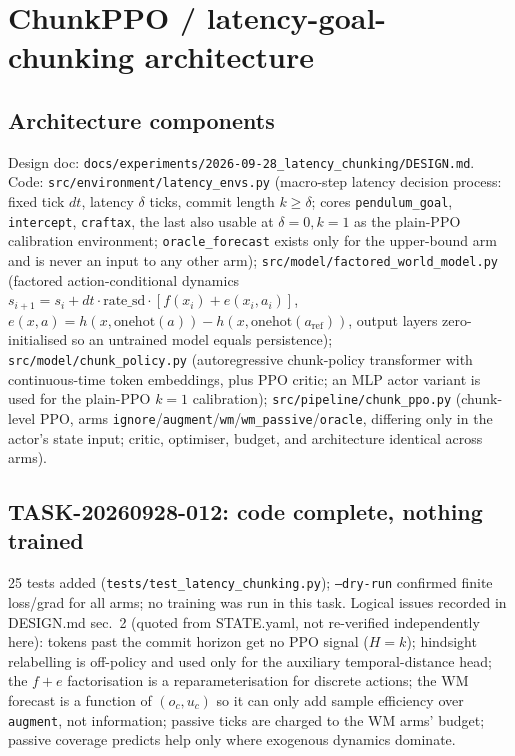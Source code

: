 \documentclass[11pt]{article}
\newcommand{\srcpath}[1]{\texttt{\small #1}}
\begin{document}
\clearpage
\section{ChunkPPO / latency-goal-chunking architecture}
\label{sec:latency}

\subsection{Architecture components}

Design doc: \srcpath{docs/experiments/2026-09-28\_latency\_chunking/DESIGN.md}. Code:
\srcpath{src/environment/latency\_envs.py} (macro-step latency decision process: fixed tick $dt$,
latency $\delta$ ticks, commit length $k \ge \delta$; cores \texttt{pendulum\_goal},
\texttt{intercept}, \texttt{craftax}, the last also usable at $\delta=0,k=1$ as the plain-PPO
calibration environment; \texttt{oracle\_forecast} exists only for the upper-bound arm and is never
an input to any other arm); \srcpath{src/model/factored\_world\_model.py} (factored
action-conditional dynamics $s_{i+1}=s_i+dt\cdot\text{rate\_sd}\cdot[f(x_i)+e(x_i,a_i)]$,
$e(x,a)=h(x,\text{onehot}(a))-h(x,\text{onehot}(a_{\text{ref}}))$, output layers zero-initialised so
an untrained model equals persistence); \srcpath{src/model/chunk\_policy.py} (autoregressive
chunk-policy transformer with continuous-time token embeddings, plus PPO critic; an MLP actor
variant is used for the plain-PPO $k=1$ calibration); \srcpath{src/pipeline/chunk\_ppo.py}
(chunk-level PPO, arms \texttt{ignore}/\texttt{augment}/\texttt{wm}/\texttt{wm\_passive}/\texttt{oracle},
differing only in the actor's state input; critic, optimiser, budget, and architecture identical
across arms).

\subsection{TASK-20260928-012: code complete, nothing trained}

25 tests added (\srcpath{tests/test\_latency\_chunking.py}); \texttt{--dry-run} confirmed finite
loss/grad for all arms; no training was run in this task. Logical issues recorded in DESIGN.md
sec.\ 2 (quoted from STATE.yaml, not re-verified independently here): tokens past the commit
horizon get no PPO signal ($H=k$); hindsight relabelling is off-policy and used only for the
auxiliary temporal-distance head; the $f+e$ factorisation is a reparameterisation for discrete
actions; the WM forecast is a function of $(o_c,u_c)$ so it can only add sample efficiency over
\texttt{augment}, not information; passive ticks are charged to the WM arms' budget; passive
coverage predicts help only where exogenous dynamics dominate.
\end{document}
